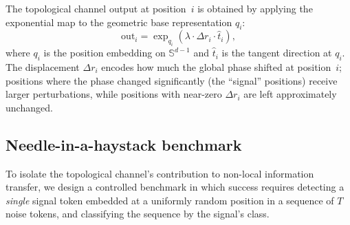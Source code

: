 \documentclass[11pt,a4paper]{article}
\theoremstyle{definition}
\theoremstyle{remark}
\newcommand{\Sphere}{\mathbb{S}}
\begin{document}
The topological channel output at position~$i$ is obtained by 
applying the exponential map to the geometric base 
representation $q_i$:
\begin{equation}\label{eq:topo_output}
  \mathrm{out}_i = \exp_{q_i}\!\left(\lambda \cdot \Delta r_i 
  \cdot \hat{t}_i\right),
\end{equation}
where $q_i$ is the position embedding on $\Sphere^{d-1}$ and 
$\hat{t}_i$ is the tangent direction at $q_i$. The displacement 
$\Delta r_i$ encodes how much the global phase shifted at 
position~$i$; positions where the phase changed significantly 
(the ``signal'' positions) receive larger perturbations, while 
positions with near-zero $\Delta r_i$ are left approximately 
unchanged.

\subsection{Needle-in-a-haystack benchmark}%
\label{sec:topo_needle_bench}

To isolate the topological channel's contribution to non-local 
information transfer, we design a controlled benchmark in which 
success requires detecting a \emph{single} signal token embedded 
at a uniformly random position in a sequence of $T$ noise 
tokens, and classifying the sequence by the signal's class.
\end{document}
